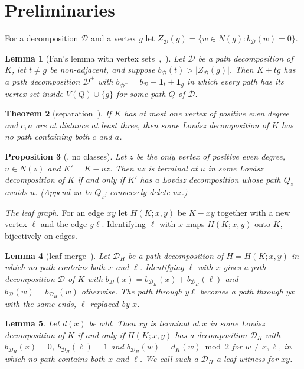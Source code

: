 \documentclass[11pt]{amsart}
\newtheorem{theorem}{Theorem}[section]
\newtheorem{lemma}[theorem]{Lemma}
\newtheorem{proposition}[theorem]{Proposition}
\theoremstyle{definition}
\newcommand{\cD}{\mathcal D}
\begin{document}
\section{Preliminaries}\label{sec:prelim}

For a decomposition $\cD$ and a vertex $g$ let $Z_\cD(g)=\{w\in N(g):b_\cD(w)=0\}$.

\begin{lemma}[{Fan's lemma with vertex sets~\cite{Fan05},~\cite[Lemma~2.2]{RD}}]\label{lem:fan}
Let $\cD$ be a path decomposition of $K$, let $t\ne g$ be non-adjacent, and suppose
$b_\cD(t)>|Z_\cD(g)|$. Then $K+tg$ has a path decomposition $\cD^+$ with
$b_{\cD^+}=b_\cD-\mathbf 1_t+\mathbf 1_g$ in which every path has its vertex set inside $V(Q)\cup\{g\}$
for some path $Q$ of $\cD$.
\end{lemma}

\begin{theorem}[{separation~\cite[Theorem~6.1]{RD}}]\label{thm:sep}
If $K$ has at most one vertex of positive even degree and $c,a$ are at distance at least three, then
some Lov\'asz decomposition of $K$ has no path containing both $c$ and $a$.
\end{theorem}

\begin{proposition}[{\cite[Proposition~16]{MS}, no classes}]\label{prop:EEequiv}
Let $z$ be the only vertex of positive even degree, $u\in N(z)$ and $K'=K-uz$. Then $uz$ is terminal at
$u$ in some Lov\'asz decomposition of $K$ if and only if $K'$ has a Lov\'asz decomposition whose path
$Q_z$ avoids $u$. (Append $zu$ to $Q_z$; conversely delete $uz$.)
\end{proposition}

\emph{The leaf graph.} For an edge $xy$ let $H(K;x,y)$ be $K-xy$ together with a new vertex $\ell$ and
the edge $y\ell$. Identifying $\ell$ with $x$ maps $H(K;x,y)$ onto $K$, bijectively on edges.

\begin{lemma}[leaf merge~{\cite[Lemma~12]{MS}}]\label{lem:merge}
Let $\cD_H$ be a path decomposition of $H=H(K;x,y)$ in which no path contains both $x$ and $\ell$.
Identifying $\ell$ with $x$ gives a path decomposition $\cD$ of $K$ with $b_\cD(x)=b_{\cD_H}(x)+
b_{\cD_H}(\ell)$ and $b_\cD(w)=b_{\cD_H}(w)$ otherwise. The path through $y\ell$ becomes a path through
$yx$ with the same ends, $\ell$ replaced by $x$.
\end{lemma}

\begin{lemma}\label{lem:leafequiv}
Let $d(x)$ be odd. Then $xy$ is terminal at $x$ in some Lov\'asz decomposition of $K$ if and only if
$H(K;x,y)$ has a decomposition $\cD_H$ with $b_{\cD_H}(x)=0$, $b_{\cD_H}(\ell)=1$ and
$b_{\cD_H}(w)=d_K(w)\bmod 2$ for $w\ne x,\ell$, in which no path contains both $x$ and $\ell$. We call
such a $\cD_H$ a \emph{leaf witness} for $xy$.
\end{lemma}
\end{document}
